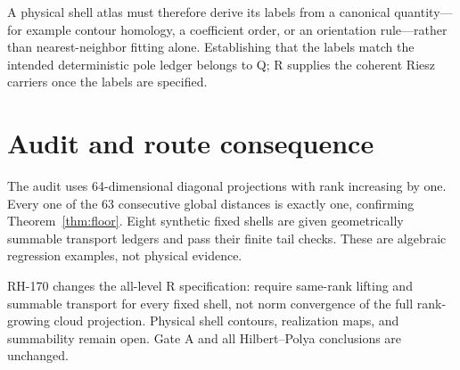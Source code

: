 \documentclass[12pt]{article}
\begin{document}
A physical shell atlas must therefore derive its labels from a canonical
quantity---for example contour homology, a coefficient order, or an
orientation rule---rather than nearest-neighbor fitting alone.  Establishing
that the labels match the intended deterministic pole ledger belongs to Q;
R supplies the coherent Riesz carriers once the labels are specified.

\section{Audit and route consequence}
The audit uses 64-dimensional diagonal projections with rank increasing by
one.  Every one of the 63 consecutive global distances is exactly one,
confirming Theorem~\ref{thm:floor}.  Eight synthetic fixed shells are given
geometrically summable transport ledgers and pass their finite tail checks.
These are algebraic regression examples, not physical evidence.

RH-170 changes the all-level R specification: require same-rank lifting and
summable transport for every fixed shell, not norm convergence of the full
rank-growing cloud projection.  Physical shell contours, realization maps,
and summability remain open.  Gate A and all Hilbert--Polya conclusions are
unchanged.



\end{document}
